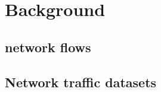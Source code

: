 \documentclass[
	ngerman,
	ruledheaders=section,%
	class=report,%
	thesis={type=bachelor},%
	accentcolor=9c,%
	custommargins=true,%
	marginpar=false,%
	parskip=half-,%
	fontsize=11pt,%
]{tudapub}
\begin{document}
\chapter{Background}


%
%

\section{network flows}

\section{Network traffic datasets}
\end{document}
